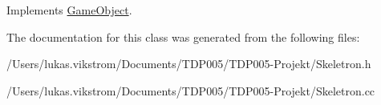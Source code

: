 Implements \hyperlink{class_game_object}{Game\+Object}.



The documentation for this class was generated from the following files\+:\begin{DoxyCompactItemize}
\item 
/\+Users/lukas.\+vikstrom/\+Documents/\+T\+D\+P005/\+T\+D\+P005-\/\+Projekt/Skeletron.\+h\item 
/\+Users/lukas.\+vikstrom/\+Documents/\+T\+D\+P005/\+T\+D\+P005-\/\+Projekt/Skeletron.\+cc\end{DoxyCompactItemize}

